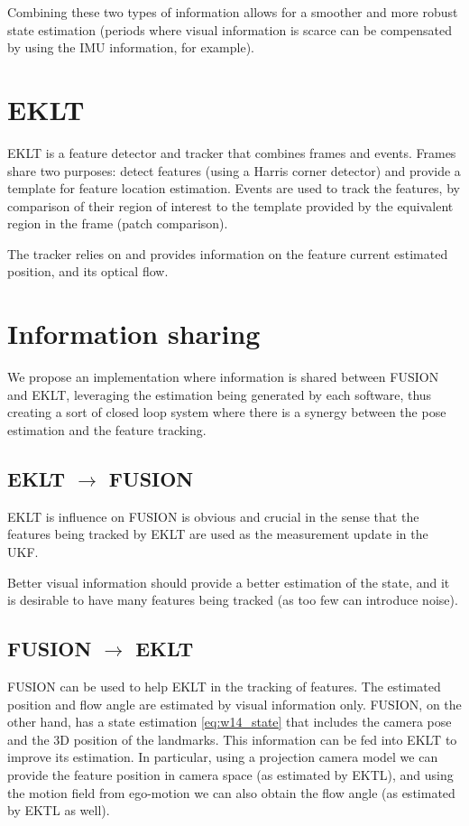 \documentclass[10pt,twocolumn]{IEEEtran}
\begin{document}
Combining these two types of information allows for a smoother and more robust state estimation (periods where visual information is scarce can be compensated by using the IMU information, for example).

\section{EKLT}

EKLT is a feature detector and tracker that combines frames and events. Frames share two purposes: detect features (using a Harris corner detector) and provide a template for feature location estimation. Events are used to track the features, by comparison of their region of interest to the template provided by the equivalent region in the frame (patch comparison).

The tracker relies on and provides information on the feature current estimated position, and its optical flow.

\section{Information sharing}

We propose an implementation where information is shared between FUSION and EKLT, leveraging the estimation being generated by each software, thus creating a sort of closed loop system where there is a synergy between the pose estimation and the feature tracking.

\subsection{EKLT $\rightarrow$ FUSION}

EKLT is influence on FUSION is obvious and crucial in the sense that the features being tracked by EKLT are used as the measurement update in the UKF. 

Better visual information should provide a better estimation of the state, and it is desirable to have many features being tracked (as too few can introduce noise).

\subsection{FUSION $\rightarrow$ EKLT}

FUSION can be used to help EKLT in the tracking of features. The estimated position and flow angle are estimated by visual information only. FUSION, on the other hand, has a state estimation \eqref{eq:w14_state} that includes the camera pose and the 3D position of the landmarks. This information can be fed into EKLT to improve its estimation. In particular, using a projection camera model we can provide the feature position in camera space (as estimated by EKTL), and using the motion field from ego-motion we can also obtain the flow angle (as estimated by EKTL as well).
\end{document}

